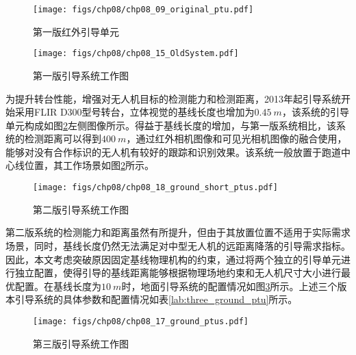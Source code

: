 \begin{figure}[!t]
	\begin{minipage}{0.5\textwidth}
		\centering
		\texttt{[image: figs/chp08/chp08\_09\_original\_ptu.pdf]}	
		\caption{第一版红外引导单元}
		\label{fig:first_version_ptu}
	\end{minipage}\hfill
	\begin{minipage}{0.5\textwidth}
		\centering
		\texttt{[image: figs/chp08/chp08\_15\_OldSystem.pdf]}	
		\caption{第一版引导系统工作图}
		\label{fig:first_version_ptu_2}
	\end{minipage}
\end{figure}

为提升转台性能，增强对无人机目标的检测能力和检测距离，2013年起引导系统开始采用FLIR D300型号转台，立体视觉的基线长度也增加为$0.45\ m$，该系统的引导单元构成如图\ref{fig:chp08_18_ground_short_ptus}左侧图像所示。得益于基线长度的增加，与第一版系统相比，该系统的检测距离可以得到$400\ m$，通过红外相机图像和可见光相机图像的融合使用，能够对没有合作标识的无人机有较好的跟踪和识别效果。该系统一般放置于跑道中心线位置，其工作场景如图\ref{fig:chp08_18_ground_short_ptus}所示。

\begin{figure}[!ht]
	\centering
	\texttt{[image: figs/chp08/chp08\_18\_ground\_short\_ptus.pdf]}	
	\caption{第二版引导系统工作图}
	\label{fig:chp08_18_ground_short_ptus}
\end{figure}

第二版系统的检测能力和距离虽然有所提升，但由于其放置位置不适用于实际需求场景，同时，基线长度仍然无法满足对中型无人机的远距离降落的引导需求指标。因此，本文考虑突破原因固定基线物理机构的约束，通过将两个独立的引导单元进行独立配置，使得引导的基线距离能够根据物理场地约束和无人机尺寸大小进行最优配置。在基线长度为$10\  m$时，地面引导系统的配置情况如图\ref{fig:chp08_17_ground_ptus}所示。上述三个版本引导系统的具体参数和配置情况如表\ref{lab:three_ground_ptu}所示。

\begin{figure}[!t]
	\centering
	\texttt{[image: figs/chp08/chp08\_17\_ground\_ptus.pdf]}	
	\caption{第三版引导系统工作图}
	\label{fig:chp08_17_ground_ptus}
\end{figure}

